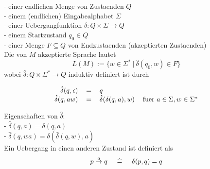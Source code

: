 \documentclass[paper=a4, fontsize=11pt]{scrartcl} %
\numberwithin{equation}{section} %
\numberwithin{figure}{section} %
\numberwithin{table}{section} %
\begin{document}
- einer endlichen Menge von Zustaenden $Q$\\
- einem (endlichen) Eingabealphabet $\Sigma$\\
- einer Uebergangfunktion $\delta:Q\times\Sigma\rightarrow Q$\\
- einem Startzustand $q_0\in Q$\\
- einer Menge $F\subseteq Q$ von Endzustaenden (akzeptierten Zustaenden)\\

Die von $M$ akzeptierte Sprache lautet 
$$L(M):=\big\{w\in\Sigma^*\ |\ \hat\delta(q_0,w)\in F\big\}$$
wobei $\hat\delta:Q\times\Sigma^*\rightarrow Q$ induktiv definiert ist durch 

\[
\begin{tabular}{r c l l}
	$\hat\delta(q,\epsilon)$ & $=$ & $q$ &\\
	$\hat\delta(q, aw)$ & $=$ & $\hat\delta(\delta(q, a), w)$ & fuer $a\in\Sigma, w\in\Sigma^*$
\end{tabular}
\]

Eigenschaften von $\hat\delta:$\\

- $\hat\delta(q,a)=\delta(q, a)$\\
- $\hat\delta(q,wa)=\delta(\hat\delta(q,w),a)$\\

Ein Uebergang in einen anderen Zustand ist definiert als
$$p\stackrel{a}\rightarrow q\hspace{0.5cm}\widehat{=}\hspace{0.5cm}\delta(p,q)=q$$
\end{document}
